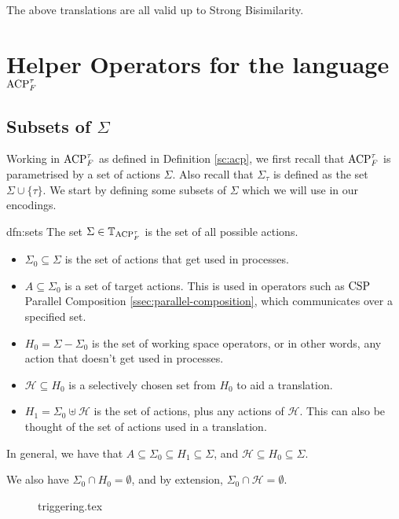 \documentclass[../hons_project.tex]{subfiles}
\begin{document}
The above translations are all valid up to Strong Bisimilarity.

\section{Helper Operators for the language \texorpdfstring{$\mathrm{ACP}_{F}^{\tau}$}{ACPTF}}

\subsection{Subsets of \texorpdfstring{$\Sigma$}{ Sigma}}
Working in $\mathrm{ACP}_{F}^{\tau}$ as defined in Definition \ref{sc:acp}, we first recall that $\mathrm{ACP}_{F}^{\tau}$ is parametrised by a set of actions $\Sigma$. Also recall that $\Sigma_{\tau}$ is defined as the set $\Sigma \cup \{\tau\}$. We start by defining some subsets of $\Sigma$ which we will use in our encodings.

\begin{dfn}[Subsets of A]{dfn:sets}{}
	The set $\Sigma\in \mathbb{T}_{\mathrm{ACP}_{F}^{\tau}}$ is the set of all possible actions.
	\begin{itemize}
		\item $\Sigma_{0} \subseteq \Sigma$ is the set of actions that get used in processes.
		\item $A \subseteq \Sigma_{0}$ is a set of target actions. This is used in operators such as $\mathrm{CSP}$ Parallel Composition \eqref{ssec:parallel-composition}, which communicates over a specified set.
		\item $H_{0} = \Sigma - \Sigma_{0}$ is the set of working space operators, or in other words, any action that doesn't get used in processes.
		\item $\mathscr{H} \subseteq H_{0}$ is a selectively chosen set from $H_{0}$ to aid a translation.
		\item $H_{1} = \Sigma_{0} \uplus \mathscr{H}$ is the set of actions, plus any actions of $\mathscr{H}$. This can also be thought of the set of actions used in a translation.
	\end{itemize}

	In general, we have that $A \subseteq \Sigma_{0} \subseteq H_{1} \subseteq \Sigma$, and $\mathscr{H} \subseteq H_{0} \subseteq \Sigma$.

	We also have $\Sigma_{0} \cap H_{0} = \emptyset$, and by extension, $\Sigma_{0} \cap \mathscr{H} = \emptyset$.
\end{dfn}


\begin{figure}[!ht]
	\centering
	{triggering.tex}
\end{figure}
\end{document}
